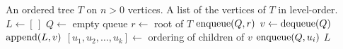 
\begin{algorithmic}[1]
\Require An ordered tree $T$ on $n > 0$ vertices.
\Ensure A list of the vertices of $T$ in level-order.
\State $L \gets [\,]$
\State $Q \gets$ empty queue
\State $r \gets$ root of $T$
\State $\operatorname*{enqueue}(Q, r)$
  \State $v \gets \operatorname*{dequeue}(Q)$
  \State $\operatorname*{append}(L, v)$
  \State $[u_1, u_2, \dots, u_k] \gets$ ordering of children of $v$
    \State $\operatorname*{enqueue}(Q, u_i)$
  \EndFor
\EndWhile
\State \Return $L$
\end{algorithmic}
